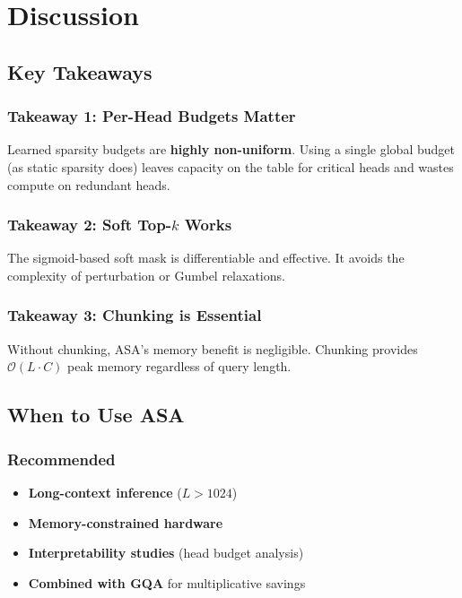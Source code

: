 
\section{Discussion}

\subsection{Key Takeaways}

\subsubsection{Takeaway 1: Per-Head Budgets Matter}

Learned sparsity budgets are \textbf{highly non-uniform}. Using a single global 
budget (as static sparsity does) leaves capacity on the table for critical 
heads and wastes compute on redundant heads.

\subsubsection{Takeaway 2: Soft Top-$k$ Works}

The sigmoid-based soft mask is differentiable and effective. It avoids 
the complexity of perturbation or Gumbel relaxations.

\subsubsection{Takeaway 3: Chunking is Essential}

Without chunking, ASA's memory benefit is negligible. Chunking provides 
$\mathcal{O}(L \cdot C)$ peak memory regardless of query length.

\subsection{When to Use ASA}

\subsubsection{Recommended}

\begin{itemize}
\item \textbf{Long-context inference} ($L > 1024$)
\item \textbf{Memory-constrained hardware}
\item \textbf{Interpretability studies} (head budget analysis)
\item \textbf{Combined with GQA} for multiplicative savings

\end{itemize}
